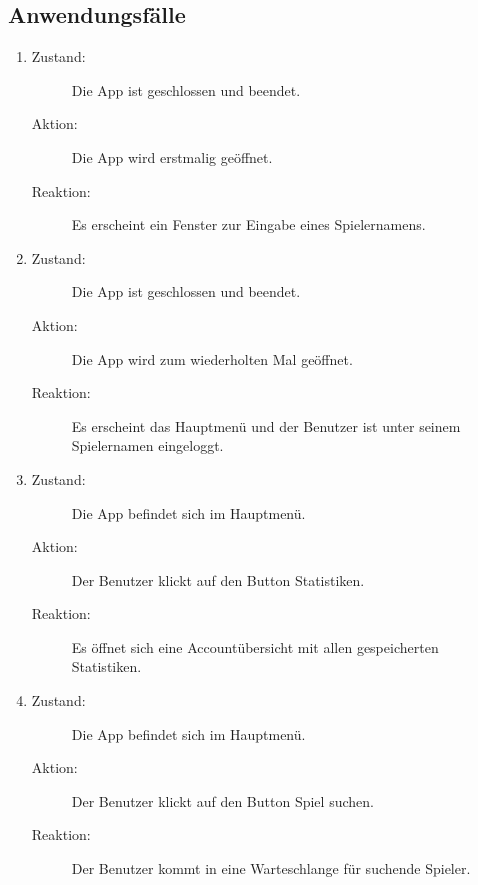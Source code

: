 \documentclass[parskip=full]{scrartcl}
\begin{document}
\subsection{Anwendungsfälle}
\begin{enumerate}
 
    \item
	\begin{description}
	\item[Zustand:] Die App ist geschlossen und beendet.
	\item[Aktion:] Die App wird erstmalig geöffnet.
	\item[Reaktion:] Es erscheint ein Fenster zur Eingabe eines Spielernamens.  \\	
	\end{description}
	
	\item
	\begin{description}
	\item[Zustand:] Die App ist geschlossen und beendet.
	\item[Aktion:] Die App wird zum wiederholten Mal geöffnet.
	\item[Reaktion:] Es erscheint das Hauptmenü und der Benutzer ist unter seinem Spielernamen eingeloggt. \\
	\end{description}
	
	\item
	\begin{description}
	\item[Zustand:] Die App befindet sich im Hauptmenü.
	\item[Aktion:] Der Benutzer klickt auf den Button \glqq Statistiken\grqq.
	\item[Reaktion:] Es öffnet sich eine Accountübersicht mit allen gespeicherten Statistiken.  \\
	\end{description}
	
	\item
	\begin{description}
	\item[Zustand:] Die App befindet sich im Hauptmenü.
	\item[Aktion:] Der Benutzer klickt auf den Button \glqq Spiel suchen\grqq.
	\item[Reaktion:] Der Benutzer kommt in eine Warteschlange für suchende Spieler.  \\
	\end{description}
	

\end{enumerate}
\end{document}
